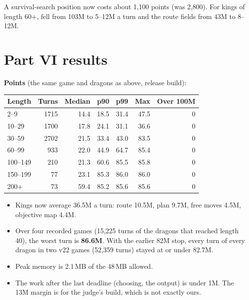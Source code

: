 \documentclass[11pt,a4paper]{article}
\newcommand{\code}[1]{\texttt{\detokenize{#1}}}
\begin{document}
A survival-search position now costs about 1,100 points (was 2,800). For kings of length 60+, \code{plan_options} fell from
103M to 5--12M a turn and the route fields from 43M to 8--12M.

\section{Part VI results}
\textbf{Points} (the same game and dragons as above, release build):
\begin{center}
      \begin{tabular}{@{}lrrrrrr@{}}
            \toprule
            Length   & Turns & Median & p90  & p99  & Max  & Over 100M \\
            \midrule
            2--9     & 1715  & 14.4   & 18.5 & 31.4 & 47.5 & 0         \\
            10--29   & 1700  & 17.8   & 24.1 & 31.1 & 36.6 & 0         \\
            30--59   & 2702  & 21.5   & 33.4 & 43.0 & 83.5 & 0         \\
            60--99   & 933   & 22.0   & 44.9 & 64.7 & 85.4 & 0         \\
            100--149 & 210   & 21.3   & 60.6 & 85.5 & 85.8 & 0         \\
            150--199 & 77    & 23.1   & 85.3 & 86.0 & 86.0 & 0         \\
            200+     & 73    & 59.4   & 85.2 & 85.6 & 85.6 & 0         \\
            \bottomrule
      \end{tabular}
\end{center}
\begin{itemize}
      \item Kings now average 36.5M a turn: route 10.5M, plan 9.7M, free moves 4.5M, objective map 4.4M.
      \item Over four recorded games (15,225 turns of the dragons that reached length 40), the worst turn is \textbf{86.6M}.
            With the earlier 82M stop, every turn of every dragon in two v22 games (52,359 turns) stayed at or under 82.7M.
      \item Peak memory is 2.1\,MB of the 48\,MB allowed.
      \item The work after the last deadline (choosing, the output) is under 1M. The 13M margin is for the judge's build, which
            is not exactly ours.
\end{itemize}
\end{document}
